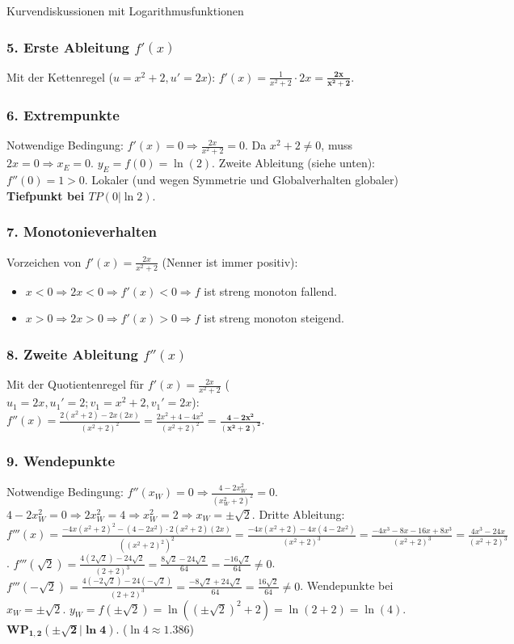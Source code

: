 \begin{loesungsumgebung}{Kurvendiskussionen mit Logarithmusfunktionen}
\begin{enumerate}[label=(\alph*)]
    \subsubsection*{5. Erste Ableitung $f'(x)$}
    Mit der Kettenregel ($u=x^2+2, u'=2x$):
    $f'(x) = \frac{1}{x^2+2} \cdot 2x = \mathbf{\frac{2x}{x^2+2}}$.

    \subsubsection*{6. Extrempunkte}
    Notwendige Bedingung: $f'(x)=0 \Rightarrow \frac{2x}{x^2+2}=0$. Da $x^2+2 \neq 0$, muss $2x=0 \Rightarrow x_E=0$.
    $y_E = f(0) = \ln(2)$.
    Zweite Ableitung (siehe unten): $f''(0) = 1 > 0$.
    Lokaler (und wegen Symmetrie und Globalverhalten globaler) \textbf{Tiefpunkt bei $TP(0|\ln 2)$}.

    \subsubsection*{7. Monotonieverhalten}
    Vorzeichen von $f'(x)=\frac{2x}{x^2+2}$ (Nenner ist immer positiv):
    \begin{itemize}
        \item $x < 0 \Rightarrow 2x < 0 \Rightarrow f'(x) < 0 \Rightarrow f$ ist streng monoton fallend.
        \item $x > 0 \Rightarrow 2x > 0 \Rightarrow f'(x) > 0 \Rightarrow f$ ist streng monoton steigend.
    \end{itemize}

    \subsubsection*{8. Zweite Ableitung $f''(x)$}
    Mit der Quotientenregel für $f'(x)=\frac{2x}{x^2+2}$ ($u_1=2x, u_1'=2; v_1=x^2+2, v_1'=2x$):
    $f''(x) = \frac{2(x^2+2) - 2x(2x)}{(x^2+2)^2} = \frac{2x^2+4-4x^2}{(x^2+2)^2} = \mathbf{\frac{4-2x^2}{(x^2+2)^2}}$.

    \subsubsection*{9. Wendepunkte}
    Notwendige Bedingung: $f''(x_W)=0 \Rightarrow \frac{4-2x_W^2}{(x_W^2+2)^2}=0$.
    $4-2x_W^2=0 \Rightarrow 2x_W^2=4 \Rightarrow x_W^2=2 \Rightarrow x_W=\pm\sqrt{2}$.
    Dritte Ableitung: $f'''(x) = \frac{-4x(x^2+2)^2 - (4-2x^2) \cdot 2(x^2+2)(2x)}{((x^2+2)^2)^2} = \frac{-4x(x^2+2) - 4x(4-2x^2)}{(x^2+2)^3} = \frac{-4x^3-8x-16x+8x^3}{(x^2+2)^3} = \frac{4x^3-24x}{(x^2+2)^3}$.
    $f'''(\sqrt{2}) = \frac{4(2\sqrt{2})-24\sqrt{2}}{(2+2)^3} = \frac{8\sqrt{2}-24\sqrt{2}}{64} = \frac{-16\sqrt{2}}{64} \neq 0$.
    $f'''(-\sqrt{2}) = \frac{4(-2\sqrt{2})-24(-\sqrt{2})}{(2+2)^3} = \frac{-8\sqrt{2}+24\sqrt{2}}{64} = \frac{16\sqrt{2}}{64} \neq 0$.
    Wendepunkte bei $x_W=\pm\sqrt{2}$.
    $y_W = f(\pm\sqrt{2}) = \ln((\pm\sqrt{2})^2+2) = \ln(2+2) = \ln(4)$.
    $\mathbf{WP_{1,2}(\pm\sqrt{2}|\ln 4)}$. ($\ln 4 \approx 1.386$)


\end{enumerate}
\end{loesungsumgebung}
